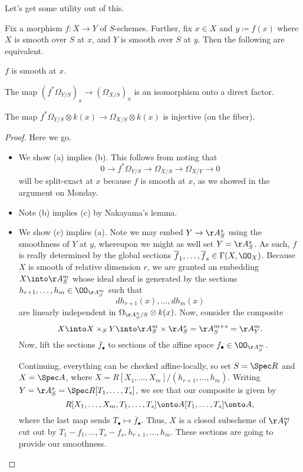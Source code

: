 \documentclass[../notes.tex]{subfiles}
\begin{document}
Let's get some utility out of this.
\begin{proposition}
	Fix a morphism $f\colon X\to Y$ of $S$-schemes. Further, fix $x\in X$ and $y\coloneqq f(x)$ where $X$ is smooth over $S$ at $x$, and $Y$ is smooth over $S$ at $y$. Then the following are equivalent.
	\begin{listalph}
		\item $f$ is smooth at $x$.
		\item The map $(f^*\Omega_{Y/S})_x\to(\Omega_{X/S})_x$ is an isomorphism onto a direct factor.
		\item The map $f^*\Omega_{Y/S}\otimes k(x)\to\Omega_{X/S}\otimes k(x)$ is injective (on the fiber).
	\end{listalph}
\end{proposition}
\begin{proof}
	Here we go.
	\begin{itemize}
		\item We show (a) implies (b). This follows from noting that
		\[0\to f^*\Omega_{Y/S}\to\Omega_{X/S}\to\Omega_{X/Y}\to0\]
		will be split-exact at $x$ because $f$ is smooth at $x$, as we showed in the argument on Monday.
		\item Note (b) implies (c) by Nakayama's lemma.
		\item We show (c) implies (a). Note we may embed $Y\to\AA^s_S$ using the smoothness of $Y$ at $y$, whereupon we might as well set $Y=\AA^s_S$. As such, $f$ is really determined by the global sections $\overline f_1,\ldots,\overline f_s\in\Gamma(X,\OO_X)$. Because $X$ is smooth of relative dimension $r$, we are granted an embedding $X\into\AA^m_S$ whose ideal sheaf is generated by the sections $h_{r+1},\ldots,h_m\in\OO_{\AA^m_S}$ such that
		\[dh_{r+1}(x),\ldots,dh_m(x)\]
		are linearly independent in $\Omega_{\AA^n_S/S}\otimes k(x)$. Now, consider the composite
		\[X\into X\times_SY\into\AA^m_S\times\AA^s_S=\AA^{m+s}_S=\AA^m_Y.\]
		Now, lift the sections $\overline f_\bullet$ to sections of the affine space $f_\bullet\in\OO_{\AA^m_S}$.

		Continuing, everything can be checked affine-locally, so set $S=\Spec R$ and $X=\Spec A$, where $X=R[X_1,\ldots,X_m]/(h_{r+1},\ldots,h_m)$. Writing $Y=\AA^s_S=\Spec R[T_1,\ldots,T_s]$, we see that our composite is given by
		\[R[X_1,\ldots,X_m,T_1,\ldots,T_s]\onto A[T_1,\ldots,T_s]\onto A,\]
		where the last map sends $T_\bullet\mapsto\overline f_\bullet$. Thus, $X$ is a closed subscheme of $\AA^m_Y$ cut out by $T_1-f_1,\ldots,T_s-f_s,h_{r+1},\ldots,h_m$. These sections are going to provide our smoothness.


\end{itemize}
\end{proof}
\end{document}
